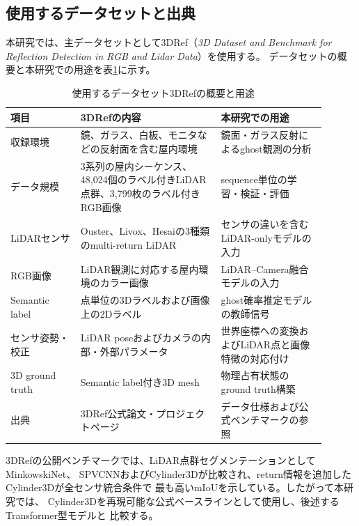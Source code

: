\documentclass[uplatex,a4paper,11pt]{jsarticle}
\begin{document}
\subsection{使用するデータセットと出典}

本研究では、主データセットとして3DRef（\textit{3D Dataset and Benchmark for
Reflection Detection in RGB and Lidar Data}）\cite{zhao2024_3dref}を使用する。
データセットの概要と本研究での用途を表\ref{tab:dataset-3dref}に示す。

\begin{table}[h]
  \centering
  \caption{使用するデータセット3DRefの概要と用途}
  \label{tab:dataset-3dref}
  \begin{tabular}{p{0.20\linewidth}p{0.40\linewidth}p{0.30\linewidth}}
    \toprule
    項目 & 3DRefの内容 & 本研究での用途 \\
    \midrule
    収録環境
      & 鏡、ガラス、白板、モニタなどの反射面を含む屋内環境
      & 鏡面・ガラス反射によるghost観測の分析 \\
    データ規模
      & 3系列の屋内シーケンス、48,024個のラベル付きLiDAR点群、3,799枚のラベル付きRGB画像
      & sequence単位の学習・検証・評価 \\
    LiDARセンサ
      & Ouster、Livox、Hesaiの3種類のmulti-return LiDAR
      & センサの違いを含むLiDAR-onlyモデルの入力 \\
    RGB画像
      & LiDAR観測に対応する屋内環境のカラー画像
      & LiDAR--Camera融合モデルの入力 \\
    Semantic label
      & 点単位の3Dラベルおよび画像上の2Dラベル
      & ghost確率推定モデルの教師信号 \\
    センサ姿勢・校正
      & LiDAR poseおよびカメラの内部・外部パラメータ
      & 世界座標への変換およびLiDAR点と画像特徴の対応付け \\
    3D ground truth
      & Semantic label付き3D mesh
      & 物理占有状態のground truth構築 \\
    出典
      & 3DRef公式論文・プロジェクトページ\cite{zhao2024_3dref}
      & データ仕様および公式ベンチマークの参照 \\
    \bottomrule
  \end{tabular}
\end{table}

3DRefの公開ベンチマークでは、LiDAR点群セグメンテーションとしてMinkowskiNet、
SPVCNNおよびCylinder3Dが比較され、return情報を追加したCylinder3Dが全センサ統合条件で
最も高いmIoUを示している\cite{zhao2024_3dref}。したがって本研究では、
Cylinder3Dを再現可能な公式ベースラインとして使用し、後述するTransformer型モデルと
比較する。
\end{document}
